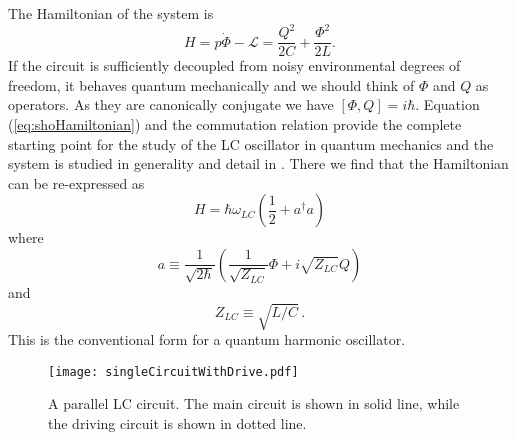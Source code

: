 The Hamiltonian of the system is \begin{equation}
H = p\dot{\Phi} - \mathcal{L} = \frac{Q^2}{2C} + \frac{\Phi^2}{2L}. \label{eq:shoHamiltonian} \end{equation}
If the circuit is sufficiently decoupled from noisy environmental degrees of freedom, it behaves quantum mechanically and we should think of $\Phi$ and $Q$ as operators.
As they are canonically conjugate we have $[\Phi,Q]=i\hbar$.
Equation (\ref{eq:shoHamiltonian}) and the commutation relation provide the complete starting point for the study of the LC oscillator in quantum mechanics and the system is studied in generality and detail in \citeinternaltype {}.
There we find that the Hamiltonian can be re-expressed as
\begin{equation}
H = \hbar \omega_{LC} \left( \frac{1}{2} + a^\dagger a \right)
\end{equation}
where
\begin{equation}
a \equiv \frac{1}{\sqrt{2\hbar}}\left(
\frac{1}{\sqrt{Z_{LC}}} \Phi +
i \sqrt{Z_{LC}} Q \right)
\end{equation}
and
\begin{equation}
Z_{LC} \equiv \sqrt{L/C} \, .
\end{equation}
This is the conventional form for a quantum harmonic oscillator.

\begin{figure}
\begin{centering}
\texttt{[image: singleCircuitWithDrive.pdf]} 
\par\end{centering}
\caption{A parallel LC circuit. The main circuit is shown in solid line, while the driving circuit is shown in dotted line.}
\label{Fig:singleCircuit}
\end{figure}
